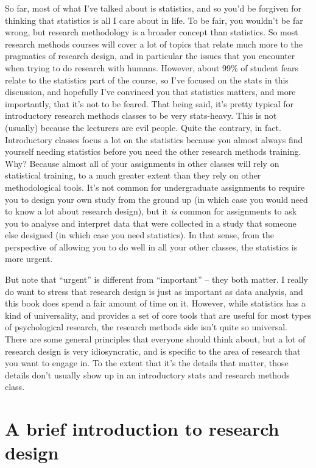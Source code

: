 \documentclass[
  letterpaper,
]{book}
\begin{document}
So far, most of what I've talked about is statistics, and so you'd be
forgiven for thinking that statistics is all I care about in life. To be
fair, you wouldn't be far wrong, but research methodology is a broader
concept than statistics. So most research methods courses will cover a
lot of topics that relate much more to the pragmatics of research
design, and in particular the issues that you encounter when trying to
do research with humans. However, about 99\% of student fears relate to
the statistics part of the course, so I've focused on the stats in this
discussion, and hopefully I've convinced you that statistics matters,
and more importantly, that it's not to be feared. That being said, it's
pretty typical for introductory research methods classes to be very
stats-heavy. This is not (usually) because the lecturers are evil
people. Quite the contrary, in fact. Introductory classes focus a lot on
the statistics because you almost always find yourself needing
statistics before you need the other research methods training. Why?
Because almost all of your assignments in other classes will rely on
statistical training, to a much greater extent than they rely on other
methodological tools. It's not common for undergraduate assignments to
require you to design your own study from the ground up (in which case
you would need to know a lot about research design), but it \emph{is}
common for assignments to ask you to analyse and interpret data that
were collected in a study that someone else designed (in which case you
need statistics). In that sense, from the perspective of allowing you to
do well in all your other classes, the statistics is more urgent.

But note that ``urgent'' is different from ``important'' -- they both
matter. I really do want to stress that research design is just as
important as data analysis, and this book does spend a fair amount of
time on it. However, while statistics has a kind of universality, and
provides a set of core tools that are useful for most types of
psychological research, the research methods side isn't quite so
universal. There are some general principles that everyone should think
about, but a lot of research design is very idiosyncratic, and is
specific to the area of research that you want to engage in. To the
extent that it's the details that matter, those details don't usually
show up in an introductory stats and research methods class.

\hypertarget{sec-A-brief-introduction-to-research-design}{%
\chapter{A brief introduction to research
design}\label{sec-A-brief-introduction-to-research-design}}
\end{document}
